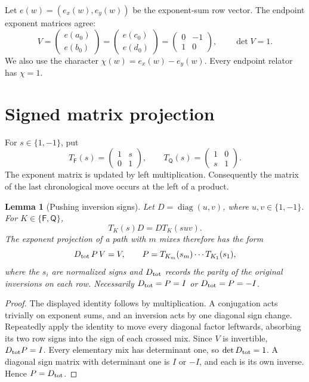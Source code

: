 \documentclass[11pt,a4paper]{article}
\newtheorem{lemma}[theorem]{Lemma}
\theoremstyle{definition}\newtheorem{definition}[theorem]{Definition}
\theoremstyle{remark}\newtheorem{remark}[theorem]{Remark}
\newcommand{\diag}{\operatorname{diag}}
\newcommand{\F}{\mathsf F}
\newcommand{\Q}{\mathsf Q}
\begin{document}
Let $e(w)=(e_x(w),e_y(w))$ be the exponent-sum row vector. The endpoint exponent matrices agree:
\[
 V=\begin{pmatrix}e(a_0)\\e(b_0)\end{pmatrix}
  =\begin{pmatrix}e(c_0)\\e(d_0)\end{pmatrix}
  =\begin{pmatrix}0&-1\\1&0\end{pmatrix},\qquad \det V=1.
\]
We also use the character $\chi(w)=e_x(w)-e_y(w)$. Every endpoint relator has $\chi=1$.

\section{Signed matrix projection}\label{sec:matrix}
For $s\in\{1,-1\}$, put
\[
 T_\F(s)=\begin{pmatrix}1&s\\0&1\end{pmatrix},\qquad
 T_\Q(s)=\begin{pmatrix}1&0\\s&1\end{pmatrix}.
\]
The exponent matrix is updated by left multiplication. Consequently the matrix of the last chronological move occurs at the left of a product.

\begin{lemma}[Pushing inversion signs]\label{lem:push}
Let $D=\diag(u,v)$, where $u,v\in\{1,-1\}$. For $K\in\{\F,\Q\}$,
\[
 T_K(s)D=D T_K(suv).
\]
The exponent projection of a path with $m$ mixes therefore has the form
\[
 D_{\rm tot}\,P\,V=V,\qquad
 P=T_{K_m}(s_m)\cdots T_{K_1}(s_1),
\]
where the $s_i$ are normalized signs and $D_{\rm tot}$ records the parity of the original inversions on each row. Necessarily $D_{\rm tot}=P=I$ or $D_{\rm tot}=P=-I$.
\end{lemma}
\begin{proof}
The displayed identity follows by multiplication. A conjugation acts trivially on exponent sums, and an inversion acts by one diagonal sign change. Repeatedly apply the identity to move every diagonal factor leftwards, absorbing its two row signs into the sign of each crossed mix. Since $V$ is invertible, $D_{\rm tot}P=I$. Every elementary mix has determinant one, so $\det D_{\rm tot}=1$. A diagonal sign matrix with determinant one is $I$ or $-I$, and each is its own inverse. Hence $P=D_{\rm tot}$.
\end{proof}
\end{document}
